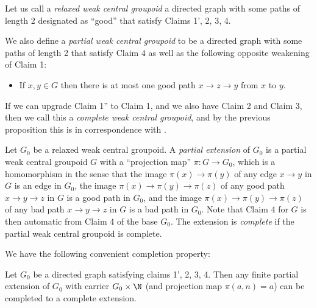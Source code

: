 Let us call a \emph{relaxed weak central groupoid} a directed graph with some paths of length 2 designated as ``good'' that satisfy Claims 1', 2, 3, 4.

We also define a \emph{partial weak central groupoid} to be a directed graph with some paths of length 2 that satisfy Claim 4 as well as the following opposite weakening of Claim 1:

\begin{itemize}
  \item[Claim 1'':] If $x,y \in G$ then there is at most one good path $x \to z \to y$ from $x$ to $y$.
\end{itemize}

If we can upgrade Claim 1'' to Claim 1, and we also have Claim 2 and Claim 3, then we call this a \emph{complete weak central groupoid}, and by the previous proposition this is in correspondence with .

Let $G_0$ be a relaxed weak central groupoid. A \emph{partial extension} of $G_0$ is a partial weak central groupoid $G$ with a ``projection map'' $\pi: G \to G_0$, which is a homomorphism in the sense that the image $\pi(x) \to \pi(y)$ of any edge $x \to y$ in $G$ is an edge in $G_0$, the image $\pi(x) \to \pi(y) \to \pi(z)$ of any good path $x \to y \to z$ in $G$ is a good path in $G_0$, and the image $\pi(x) \to \pi(y) \to \pi(z)$ of any bad path $x \to y \to z$ in $G$ is a bad path in $G_0$. Note that Claim 4 for $G$ is then automatic from Claim 4 of the base $G_0$. The extension is \emph{complete} if the partial weak central groupoid is complete.

We have the following convenient completion property:

\begin{proposition}\label{greedy-prop}\leanok{}
  Let $G_0$ be a directed graph satisfying claims 1', 2, 3, 4. Then any finite partial extension of $G_0$ with carrier $G_0 \times \N$ (and projection map $\pi(a,n) = a$) can be completed to a complete extension.
\end{proposition}

